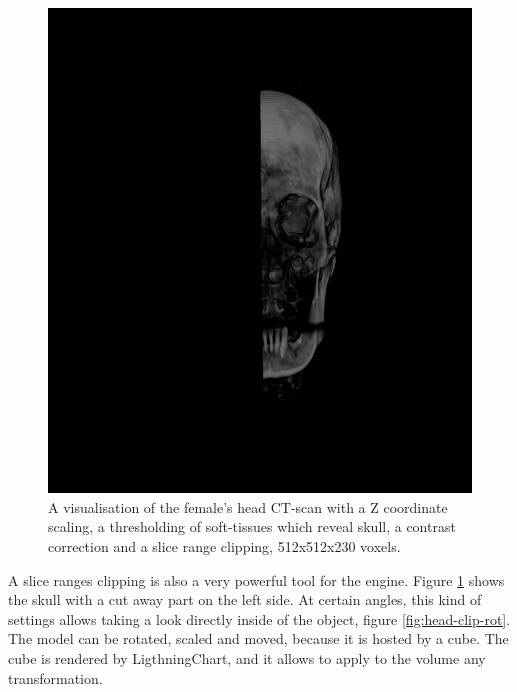 \documentclass[twoside, english, 11pt]{report}
\begin{document}
\begin{figure}[H]
\centerline{\includegraphics[scale = 0.44]{img/head-clip}}
\caption{A visualisation of the female's head CT-scan with a Z coordinate scaling, a thresholding of soft-tissues which reveal skull, a contrast correction and a slice range clipping, 512x512x230 voxels. \label{fig:head-clip}}
\end{figure}

A slice ranges clipping is also a very powerful tool for the engine. Figure \ref{fig:head-clip} shows the skull with a cut away part on the left side. At certain angles, this kind of settings allows taking a look directly inside of the object, figure \ref{fig:head-clip-rot}. The model can be rotated, scaled and moved, because it is hosted by a cube. The cube is rendered by LigthningChart, and it allows to apply to the volume any transformation.\\
\end{document}
